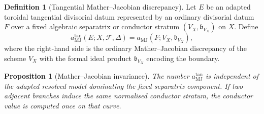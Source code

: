 \documentclass[11pt]{amsart}
\numberwithin{equation}{section}
\theoremstyle{plain}
\newtheorem{Proposition}[Theorem]{Proposition}
\theoremstyle{definition}
\newtheorem{Definition}[Theorem]{Definition}
\newcommand{\MJ}{\mathrm{MJ}}
\newcommand{\bbound}{\mathfrak b}
\newcommand{\cF}{\mathcal F}
\begin{document}
\begin{Definition}[Tangential Mather--Jacobian discrepancy]
Let $E$ be an adapted toroidal tangential divisorial datum represented by an ordinary divisorial datum $F$ over a fixed algebraic separatrix or conductor stratum $(V_X,\bbound_{V_X})$ on $X$.  Define
\[
a^{\tan}_{\MJ}(E;X,\cF,\Delta)=a_{\MJ}(F;V_X,\bbound_{V_X}),
\]
where the right-hand side is the ordinary Mather--Jacobian discrepancy of the scheme $V_X$ with the formal ideal product $\bbound_{V_X}$ encoding the boundary.
\end{Definition}

\begin{Proposition}[Mather--Jacobian invariance]
\label{prop:mj-invariance}
The number $a^{\tan}_{\MJ}$ is independent of the adapted resolved model dominating the fixed separatrix component.  If two adjacent branches induce the same normalised conductor stratum, the conductor value is computed once on that curve.
\end{Proposition}
\end{document}
